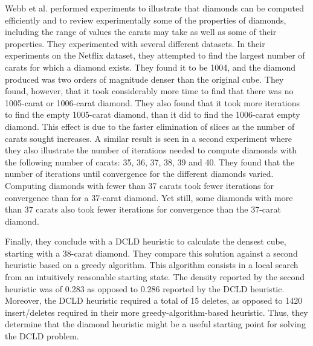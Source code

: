 \documentclass[12pt]{article}
\begin{document}
Webb et al. performed experiments to illustrate that diamonds can be computed efficiently and to review experimentally some of the properties of diamonds,
including the range of values the carats may take as well as some of their properties. They experimented with several different datasets. In their experiments on
the Netflix dataset, they attempted to find the largest number of carats for which a diamond exists. They found it to be 1004, and the diamond produced was two
orders of magnitude denser than the original cube. They found, however, that it took considerably more time to find that there was no 1005-carat or 1006-carat
diamond. They also found that it took more iterations to find the empty 1005-carat diamond, than it did to find the 1006-carat empty diamond. This effect is due
to the faster elimination of slices as the number of carats sought increases. A similar result is seen in a second experiment where they also illustrate the
number of iterations needed to compute diamonds with the following number of carats: 35, 36, 37, 38, 39 and 40. They found that the number of iterations until
convergence for the different diamonds varied. Computing diamonds with fewer than 37 carats took fewer iterations for convergence than for a 37-carat diamond.
Yet still, some diamonds with more than 37 carats also took fewer iterations for convergence than the 37-carat diamond.

Finally, they conclude with a DCLD heuristic to calculate the densest cube, starting with a 38-carat diamond. They compare this solution against a second
heuristic based on a greedy algorithm. This algorithm consists in a local search from an intuitively reasonable starting state. The density reported by the
second heuristic was of 0.283 as opposed to 0.286 reported by the DCLD heuristic. Moreover, the DCLD heuristic required a total of 15 deletes, as opposed to 1420
insert/deletes required in their more greedy-algorithm-based heuristic. Thus, they determine that the diamond heuristic might be a useful starting point for
solving the DCLD problem.
\end{document}
